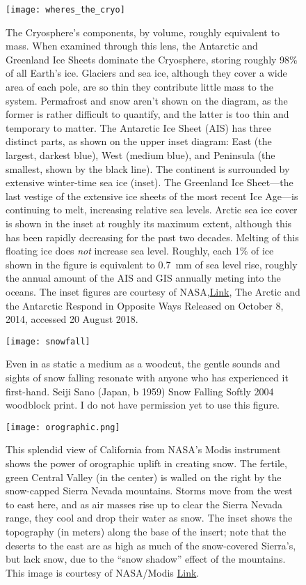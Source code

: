 \begin{figure}[p]
	\centering
  \texttt{[image: wheres\_the\_cryo]}%
	\caption{The Cryosphere's components, by volume, roughly equivalent to mass. When examined through this lens, the Antarctic and Greenland Ice Sheets dominate the Cryosphere, storing roughly 98\% of all Earth's ice. Glaciers and sea ice, although they cover a wide area of each pole, are so thin they contribute little mass to the system. Permafrost and snow aren't shown on the diagram, as the former is rather difficult to quantify, and the latter is too thin and temporary to matter. The Antarctic Ice Sheet (AIS) has three distinct parts, as shown on the upper inset diagram: East (the largest, darkest blue), West (medium blue), and Peninsula (the smallest, shown by the black line). The continent is surrounded by extensive winter-time sea ice (inset). The Greenland Ice Sheet---the last vestige of the extensive ice sheets of the most recent Ice Age---is continuing to melt, increasing relative sea levels. Arctic sea ice cover is shown in the inset at roughly its maximum extent, although this has been rapidly decreasing for the past two decades. Melting of this floating ice does \emph{not} increase sea level. Roughly, each 1\% of ice shown in the figure is equivalent to \SI{0.7}{\milli\metre} of sea level rise, roughly the annual amount of the AIS and GIS annually meting into the oceans. The inset figures are courtesy of NASA,\href{https://svs.gsfc.nasa.gov/11703}{Link}, The Arctic and the Antarctic Respond in Opposite Ways Released on October 8, 2014, accessed 20 August 2018. }
	\label{fig:wheres_the_cryo}
\end{figure}

\begin{figure}[p]
	\centering
  \texttt{[image: snowfall]}%
	\caption{Even in as static a medium as a woodcut, the gentle sounds and sights of snow falling resonate with anyone who has experienced it first-hand. Seiji Sano (Japan, b 1959) Snow Falling Softly 2004 woodblock print. I do not have permission yet to use this figure.}
	\label{fig:snowfall}
\end{figure}

\begin{figure}[p]
	\centering
  \texttt{[image: orographic.png]}%
	\caption{This splendid view of California from NASA's Modis instrument shows the power of orographic uplift in creating snow. The fertile, green Central Valley (in the center) is walled on the right by the snow-capped Sierra Nevada mountains. Storms move from the west to east here, and as air masses rise up to clear the Sierra Nevada range, they cool and drop their water as snow. The inset shows the topography (in meters) along the base of the insert; note that the deserts to the east are as high as much of the snow-covered Sierra's, but lack snow, due to the ``snow shadow'' effect of the mountains. This image is courtesy of NASA/Modis \href{https://www.ncdc.noaa.gov/sites/default/files/Sierra-Nevada-snowpack-comparison-web-quality.jpg}{Link}.  }
	\label{fig:orographic}
\end{figure}

